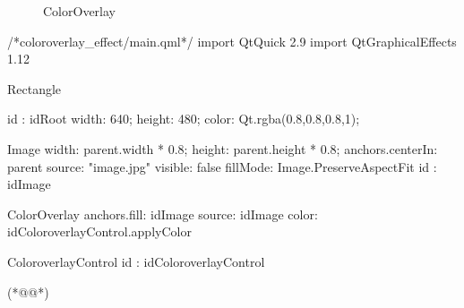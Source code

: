 \begin{figure}[htb] %
\marginnote{\setlength\fboxsep{2pt}\fbox{\footnotesize{\kaishu\figurename\,}\footnotesize{\ref{p000020}}}}\centering %
\setlength\fboxsep{-1pt} %
\caption{ColorOverlay} %
\label{p000020} %
\end{figure}


\label{f000054}    %
\FloatBarrier                                  %
\begin{thebookfilesourceone}[escapeinside={(*@}{@*)},
caption=GoodLuck,
title=\filesourcenumbernameone \thefilesourcenumber
]
/*coloroverlay_effect/main.qml*/
import QtQuick 2.9
import QtGraphicalEffects 1.12

Rectangle {

    id : idRoot
    width: 640;
    height: 480;
    color: Qt.rgba(0.8,0.8,0.8,1);

    Image{
        width: parent.width * 0.8;
        height: parent.height * 0.8;
        anchors.centerIn: parent
        source: "image.jpg"
        visible: false
        fillMode: Image.PreserveAspectFit
        id : idImage
    }

    ColorOverlay{
        anchors.fill: idImage
        source: idImage
        color: idColoroverlayControl.applyColor
    }

    ColoroverlayControl{
        id : idColoroverlayControl
    }

}(*@\marginpar[\hfill\setlength\fboxsep{2pt}\fbox{\footnotesize{\kaishu\parbox{1em}{\setlength{\baselineskip}{2pt}\filesourcenumbernameone}}\footnotesize{\thefilesourcenumber}}]{\setlength\fboxsep{2pt}\fbox{\footnotesize{\kaishu\parbox{1em}{\setlength{\baselineskip}{2pt}\filesourcenumbernameone}}\footnotesize{\thefilesourcenumber}}}@*)\end{thebookfilesourceone}          %
\addtocounter{lstlisting}{-1}   %


 









